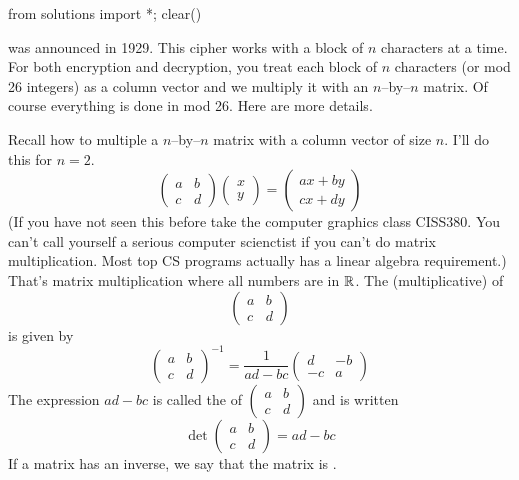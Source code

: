 \begin{python0}
from solutions import *; clear()
\end{python0}

was announced in 1929.
This cipher works with a block of $n$ characters at a time.
For both encryption and decryption, you 
treat each block of $n$ characters (or mod 26 integers) as a column
vector
and we multiply it with an $n$--by--$n$ matrix.
Of course everything is done in mod 26.
Here are more details.

Recall how to multiple a $n$--by--$n$ matrix with a column vector of
size $n$.
I'll do this for $n = 2$.
\[
\begin{pmatrix}
  a & b \\
  c & d 
\end{pmatrix}
\begin{pmatrix}
  x \\
  y 
\end{pmatrix}
=
\begin{pmatrix}
  ax + by \\
  cx + dy 
\end{pmatrix}
\]
(If you have not seen this before take the computer graphics class CISS380.
You can't call yourself a serious computer scienctist if you can't do matrix
multiplication.
Most top CS programs actually has a linear algebra requirement.) 
That's matrix multiplication where all numbers are in $\mathbb R$.
The (multiplicative)
of
\[
\begin{pmatrix}
  a & b \\
  c & d 
\end{pmatrix}
\]
is
given by
\[
\begin{pmatrix}
  a & b \\
  c & d 
\end{pmatrix}^{-1}
=
\frac{1}{ad - bc}
\begin{pmatrix}
  d & -b \\
  -c & a 
\end{pmatrix}
\]
The expression $ad - bc$ is called the
of
$\begin{pmatrix}
  a & b \\
  c & d 
\end{pmatrix}$ and is written
\[
\det
\begin{pmatrix}
  a & b \\
  c & d 
\end{pmatrix}
= ad - bc
\]
If a matrix has an inverse, we say that the matrix is
.

